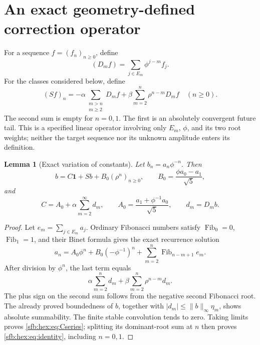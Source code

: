 \documentclass[11pt]{article}
\newtheorem{lemma}[theorem]{Lemma}
\theoremstyle{remark}\newtheorem{remark}[theorem]{Remark}
\newcommand{\one}{\boldsymbol 1}
\newcommand{\Fib}{\operatorname{Fib}}
\begin{document}
\section{An exact geometry-defined correction operator}\label{sfb:hex:sec:operator}
For a sequence $f=(f_n)_{n\ge0}$, define
\begin{equation}\label{sfb:hex:eq:D}
 (D_mf)=\sum_{j\in E_m}\phi^{j-m}f_j.
\end{equation}
For the classes considered below, define
\begin{equation}\label{sfb:hex:eq:S}
 (Sf)_n=-\alpha\sum_{\substack{m>n\\m\ge2}}D_mf
        +\beta\sum_{m=2}^n\rho^{n-m}D_mf\quad(n\ge0).
\end{equation}
The second sum is empty for $n=0,1$. The first is an absolutely convergent future tail. This is a specified linear operator involving only $E_m$, $\phi$, and its two root weights; neither the target sequence nor its unknown amplitude enters its definition.

\begin{lemma}[Exact variation of constants]\label{sfb:hex:lem:variation}
Let $b_n=a_n\phi^{-n}$. Then
\begin{equation}\label{sfb:hex:eq:identity}
 b=C\one+Sb+B_0(\rho^n)_{n\ge0},
 \qquad B_0=\frac{\phi a_0-a_1}{\sqrt5},
\end{equation}
and
\begin{equation}\label{sfb:hex:eq:Cseries}
 C=A_0+\alpha\sum_{m=2}^{\infty}d_m,
 \qquad A_0=\frac{a_1+\phi^{-1}a_0}{\sqrt5},\qquad d_m=D_mb.
\end{equation}
\end{lemma}
\begin{proof}
Let $e_m=\sum_{j\in E_m}a_j$. Ordinary Fibonacci numbers satisfy $\Fib_0=0$, $\Fib_1=1$, and their Binet formula gives the exact recurrence solution
\begin{equation}\label{sfb:hex:eq:binet}
 a_n=A_0\phi^n+B_0(-\phi^{-1})^n
       +\sum_{m=2}^n\Fib_{n-m+1}e_m.
\end{equation}
After division by $\phi^n$, the last term equals
\[
 \alpha\sum_{m=2}^n d_m+\beta\sum_{m=2}^n\rho^{n-m}d_m.
\]
The plus sign on the second sum follows from the negative second Fibonacci root. The already proved boundedness of $b$, together with $|d_m|\le\|b\|_\infty\eta_m$, shows absolute summability. The finite stable convolution tends to zero. Taking limits proves \eqref{sfb:hex:eq:Cseries}; splitting its dominant-root sum at $n$ then proves \eqref{sfb:hex:eq:identity}, including $n=0,1$.
\end{proof}
\end{document}
